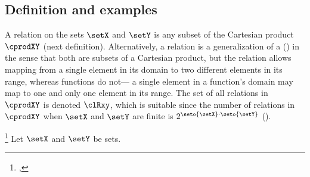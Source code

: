 \subsection{Definition and examples}
A relation on the sets $\setX$ and $\setY$ is any subset of the Cartesian product
$\cprodXY$ (next definition).
Alternatively, a relation is a generalization of a 
()
in the sense that both are subsets of a Cartesian product,
but the relation allows mapping from a single element in its domain to two different
elements in its range, whereas functions do not---
a single element in a function's domain may map to one and only one element
in its range.
The set of all relations in $\cprodXY$ is denoted $\clRxy$,
which is suitable since the number of relations in $\cprodXY$ when
$\setX$ and $\setY$ are finite is $2^{\seto{\setX}\cdot\seto{\setY}}$
().

\begin{definition}
\label{def:relation}
\footnote{
  ,
  }
Let $\setX$ and $\setY$ be sets.
\end{definition}

